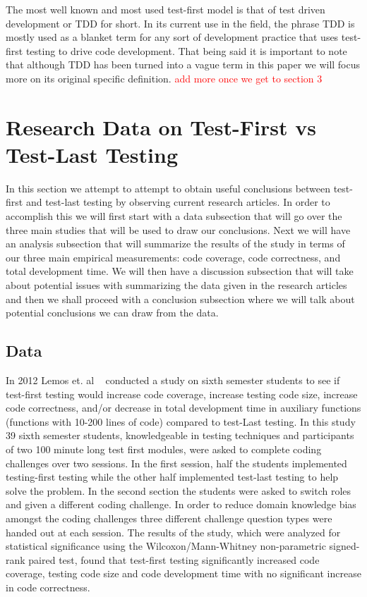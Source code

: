 \documentclass{sig-alternate}
\newcommand{\mycomment}[1]{\textcolor{red}{#1}}
\begin{document}
The most well known and most used test-first model is that of test driven development or TDD for short.  In its current use in the field, the phrase TDD is mostly used as a blanket term for any sort of development practice that uses test-first testing to drive code development. That being said it is important to note that although TDD has been turned into a vague term in this paper we will focus more on its original specific definition.  \mycomment{add more once we get to section 3} 

\section{Research Data on Test-First vs Test-Last Testing}
In this section we attempt to attempt to obtain useful conclusions between test-first and test-last testing by observing current research articles.  In order to accomplish this we will first start with a data subsection that will go over the three main studies that will be used to draw our conclusions.  Next we will have an analysis subsection that will summarize the results of the study in terms of our three main empirical measurements: code coverage, code correctness, and total development time.  We will then have a discussion subsection that will take about potential issues with summarizing the data given in the research articles and then we shall proceed with a conclusion subsection where we will talk about potential conclusions we can draw from the data. 

\subsection{Data}
 In 2012 Lemos et. al ~\cite{Lemos:2012} conducted a study on sixth semester students to see if test-first testing would increase code coverage, increase testing code size, increase code correctness, and/or decrease in total development time in auxiliary functions (functions with 10-200 lines of code) compared to test-Last testing.  In this study 39 sixth semester students, knowledgeable in testing techniques and participants of two 100 minute long test first modules, were asked to complete coding challenges over two sessions.  In the first session, half the students implemented testing-first testing while the other half implemented test-last testing to help solve the problem.  In the second section the students were asked to switch roles and given a different coding challenge.  In order to reduce domain knowledge bias amongst the coding challenges three different challenge question types were handed out at each session.  The results of the study, which were analyzed for statistical significance using the Wilcoxon/Mann-Whitney non-parametric signed-rank paired test, found that test-first testing significantly increased code coverage, testing code size and code development time with no significant increase in code correctness.
\end{document}
